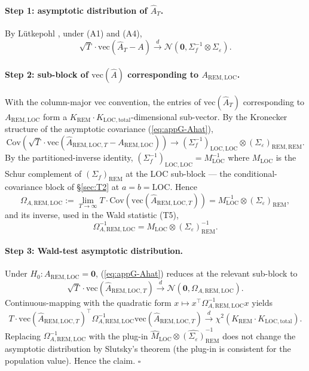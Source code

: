\documentclass[11pt,letterpaper]{article}
\theoremstyle{remark}
\newcommand{\REM}{\mathrm{REM}}
\newcommand{\LOC}{\mathrm{LOC}}
\newcommand{\Sigmaf}{\Sigma_f}
\newcommand{\Sigmae}{\Sigma_\varepsilon}
\newcommand{\Mloc}{M_{\LOC}}
\newcommand{\Ehat}{\widehat{A}}
\newcommand{\Cov}{\mathrm{Cov}}
\begin{document}
\paragraph{Step 1: asymptotic distribution of $\Ehat_T$.} By Lütkepohl \cite[Proposition~3.1, p.~74]{Lutkepohl2005}, under (A1) and (A4),
\begin{equation}\label{eq:appG-Ahat}
\sqrt{T} \cdot \mathrm{vec}(\Ehat_T - A) \xrightarrow{d} \mathcal{N}(\mathbf{0}, \Sigmaf^{-1} \otimes \Sigmae).
\end{equation}

\paragraph{Step 2: sub-block of $\mathrm{vec}(\Ehat)$ corresponding to $A_{\REM, \LOC}$.} With the column-major vec convention, the entries of $\mathrm{vec}(\Ehat_T)$ corresponding to $A_{\REM, \LOC}$ form a $K_\REM \cdot K_{\LOC, \mathrm{total}}$-dimensional sub-vector. By the Kronecker structure of the asymptotic covariance (\ref{eq:appG-Ahat}),
\begin{equation*}
\Cov\!\left(\sqrt{T} \cdot \mathrm{vec}(\Ehat_{\REM, \LOC, T} - A_{\REM, \LOC})\right) \to (\Sigmaf^{-1})_{\LOC, \LOC} \otimes (\Sigmae)_{\REM, \REM}.
\end{equation*}
By the partitioned-inverse identity, $(\Sigmaf^{-1})_{\LOC, \LOC} = \Mloc^{-1}$ where $\Mloc$ is the Schur complement of $(\Sigmaf)_\REM$ at the LOC sub-block --- the conditional-covariance block of \S\ref{sec:T2} at $a = b = \LOC$. Hence
\begin{equation*}
\Omega_{A, \REM, \LOC} := \lim_{T \to \infty} T \cdot \Cov(\mathrm{vec}(\Ehat_{\REM, \LOC, T})) = \Mloc^{-1} \otimes (\Sigmae)_\REM,
\end{equation*}
and its inverse, used in the Wald statistic (T5),
\begin{equation*}
\Omega^{-1}_{A, \REM, \LOC} = \Mloc \otimes (\Sigmae)_\REM^{-1}.
\end{equation*}

\paragraph{Step 3: Wald-test asymptotic distribution.} Under $H_0: A_{\REM, \LOC} = \mathbf{0}$, (\ref{eq:appG-Ahat}) reduces at the relevant sub-block to
\begin{equation*}
\sqrt{T} \cdot \mathrm{vec}(\Ehat_{\REM, \LOC, T}) \xrightarrow{d} \mathcal{N}(\mathbf{0}, \Omega_{A, \REM, \LOC}).
\end{equation*}
Continuous-mapping with the quadratic form $x \mapsto x^\top \Omega^{-1}_{A, \REM, \LOC} x$ yields
\begin{equation*}
T \cdot \mathrm{vec}(\Ehat_{\REM, \LOC, T})^\top \Omega^{-1}_{A, \REM, \LOC} \mathrm{vec}(\Ehat_{\REM, \LOC, T}) \xrightarrow{d} \chi^2(K_\REM \cdot K_{\LOC, \mathrm{total}}).
\end{equation*}
Replacing $\Omega^{-1}_{A, \REM, \LOC}$ with the plug-in $\widehat\Mloc \otimes \widehat{(\Sigmae)}_\REM^{-1}$ does not change the asymptotic distribution by Slutsky's theorem (the plug-in is consistent for the population value). Hence the claim. $\square$
\end{document}
